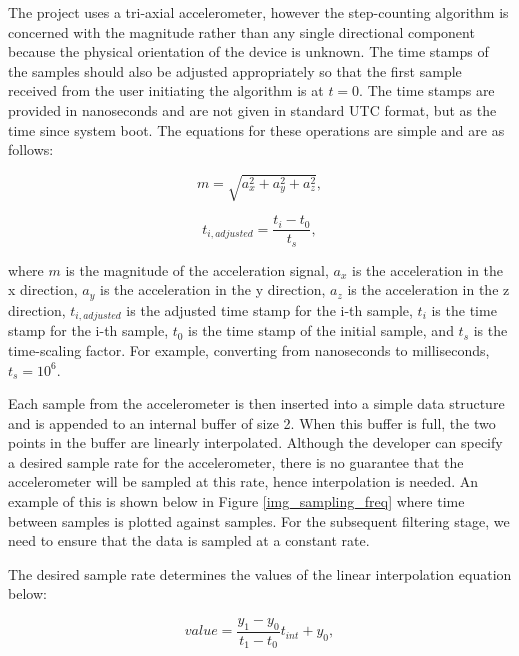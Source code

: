             The project uses a tri-axial accelerometer, however the step-counting algorithm is concerned with the magnitude rather than any single directional component because the physical orientation of the device is unknown. The time stamps of the samples should also be adjusted appropriately so that the first sample received from the user initiating the algorithm is at $t = 0$. The time stamps are provided in nanoseconds and are not given in standard UTC format, but as the time since system boot. The equations for these operations are simple and are as follows:

            \begin{equation}
                m = \sqrt{a_{x}^2 + a_{y}^2 + a_{z}^2},
            \end{equation}

            \begin{equation}
                t_{i,adjusted} = \frac{t_i - t_0}{t_s},
            \end{equation}

            where $m$ is the magnitude of the acceleration signal, $a_{x}$ is the acceleration in the x direction, $a_{y}$ is the acceleration in the y direction, $a_{z}$ is the acceleration in the z direction, $t_{i,adjusted}$ is the adjusted time stamp for the i-th sample, $t_i$ is the time stamp for the i-th sample, $t_0$ is the time stamp of the initial sample, and $t_s$ is the time-scaling factor. For example, converting from nanoseconds to milliseconds, $t_s = 10^6$. 

            Each sample from the accelerometer is then inserted into a simple data structure and is appended to an internal buffer of size 2. When this buffer is full, the two points in the buffer are linearly interpolated. Although the developer can specify a desired sample rate for the accelerometer, there is no guarantee that the accelerometer will be sampled at this rate, hence interpolation is needed. An example of this is shown below in Figure \ref{img_sampling_freq} where time between samples is plotted against samples. For the subsequent filtering stage, we need to ensure that the data is sampled at a constant rate.

            The desired sample rate determines the values of the linear interpolation equation below:

            \begin{equation}
                value = \frac{y_1 - y_0}{t_1 - t_0} t_{int} + y_0,
            \end{equation}

